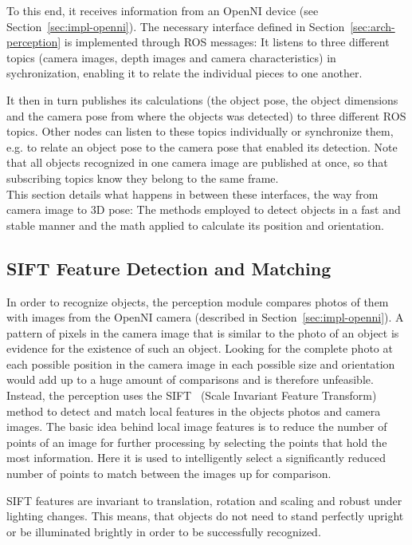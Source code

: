 To this end, it receives information from an OpenNI device (see Section~\ref{sec:impl-openni}). The necessary interface defined in Section~\ref{sec:arch-perception} is implemented through ROS messages: It listens to three different topics (camera images, depth images and camera characteristics) in sychronization, enabling it to relate the individual pieces to one another.

It then in turn publishes its calculations (the object pose, the object dimensions and the camera pose from where the objects was detected) to three different ROS topics. Other nodes can listen to these topics individually or synchronize them, e.g. to relate an object pose to the camera pose that enabled its detection. Note that all objects recognized in one camera image are published at once, so that subscribing topics know they belong to the same frame. \\

This section details what happens in between these interfaces, the way from camera image to 3D pose: The methods employed to detect objects in a fast and stable manner and the math applied to calculate its position and orientation.

\subsection{SIFT Feature Detection and Matching}
\label{sec:impl-sift}
In order to recognize objects, the perception module compares photos of them with images from the OpenNI camera (described in Section~\ref{sec:impl-openni}). A pattern of pixels in the camera image that is similar to the photo of an object is evidence for the existence of such an object. Looking for the complete photo at each possible position in the camera image in each possible size and orientation would add up to a huge amount of comparisons and is therefore unfeasible. \\

Instead, the perception uses the SIFT~\cite{sift_lowe} (Scale Invariant Feature Transform) method to detect and match local features in the objects photos and camera images. The basic idea behind local image features is to reduce the number of points of an image for further processing by selecting the points that hold the most information. Here it is used to intelligently select a significantly reduced number of points to match between the images up for comparison.

SIFT features are invariant to translation, rotation and scaling and robust under lighting changes. This means, that objects do not need to stand perfectly upright or be illuminated brightly in order to be successfully recognized.

